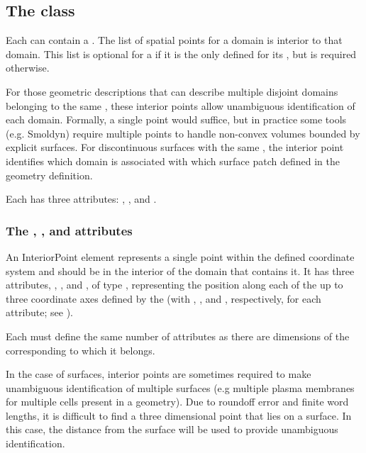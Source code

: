 \subsection{The  class}
\label{interiorpoint-class}
Each \Domain can contain a \ListOfInteriorPoints. The list of spatial points for a domain is interior to that domain.  This list is optional for a \Domain if it is the only \Domain defined for its \DomainType, but is required otherwise.

For those geometric descriptions that can describe multiple disjoint domains belonging to the same , these interior points allow unambiguous identification of each domain.  Formally, a single point would suffice, but in practice some tools (e.g. Smoldyn) require multiple points to handle non-convex volumes bounded by explicit surfaces.  For discontinuous surfaces with the same , the interior point identifies which domain is associated with which surface patch defined in the geometry definition.

Each \InteriorPoint has three attributes: , , and .

\subsubsection{The \fixttspace{}, , and  attributes}
An InteriorPoint element represents a single point within the defined coordinate system and should be in the interior of the domain that contains it. It has three attributes, , , and , of type , representing the position along each of the up to three coordinate axes defined by the \CoordinateComponents (with  , , and , respectively, for each  attribute; see ).

Each \InteriorPoint must define the same number of attributes as there are dimensions of the corresponding \Geometry to which it belongs.

In the case of surfaces, interior points are sometimes required to make unambiguous identification of multiple surfaces (e.g multiple plasma membranes for multiple cells present in a geometry).  Due to roundoff error and finite word lengths, it is difficult to find a three dimensional point that lies on a surface.  In this case, the distance from the surface will be used to provide unambiguous identification.



